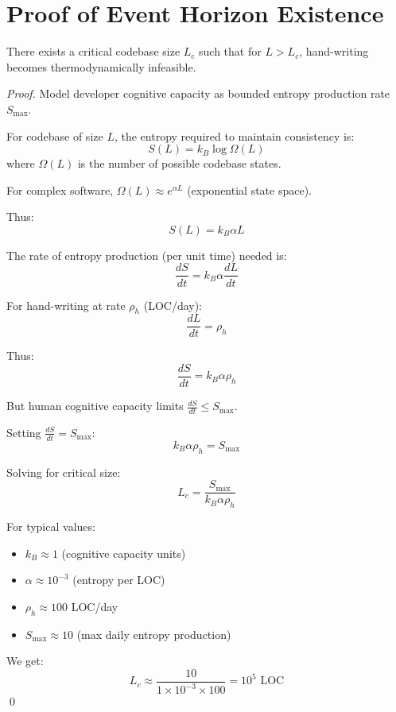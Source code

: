 \section{Proof of Event Horizon Existence}

\begin{theorem}
There exists a critical codebase size $L_c$ such that for $L > L_c$, hand-writing becomes thermodynamically infeasible.
\end{theorem}

\begin{proof}
Model developer cognitive capacity as bounded entropy production rate $S_{\max}$.

For codebase of size $L$, the entropy required to maintain consistency is:
\begin{equation}
S(L) = k_B \log \Omega(L)
\end{equation}
where $\Omega(L)$ is the number of possible codebase states.

For complex software, $\Omega(L) \approx e^{\alpha L}$ (exponential state space).

Thus:
\begin{equation}
S(L) = k_B \alpha L
\end{equation}

The rate of entropy production (per unit time) needed is:
\begin{equation}
\frac{dS}{dt} = k_B \alpha \frac{dL}{dt}
\end{equation}

For hand-writing at rate $\rho_h$ (LOC/day):
\begin{equation}
\frac{dL}{dt} = \rho_h
\end{equation}

Thus:
\begin{equation}
\frac{dS}{dt} = k_B \alpha \rho_h
\end{equation}

But human cognitive capacity limits $\frac{dS}{dt} \leq S_{\max}$.

Setting $\frac{dS}{dt} = S_{\max}$:
\begin{equation}
k_B \alpha \rho_h = S_{\max}
\end{equation}

Solving for critical size:
\begin{equation}
L_c = \frac{S_{\max}}{k_B \alpha \rho_h}
\end{equation}

For typical values:
\begin{itemize}
    \item $k_B \approx 1$ (cognitive capacity units)
    \item $\alpha \approx 10^{-3}$ (entropy per LOC)
    \item $\rho_h \approx 100$ LOC/day
    \item $S_{\max} \approx 10$ (max daily entropy production)
\end{itemize}

We get:
\begin{equation}
L_c \approx \frac{10}{1 \times 10^{-3} \times 100} = 10^5 \text{ LOC}
\end{equation}
\qed
\end{proof}

